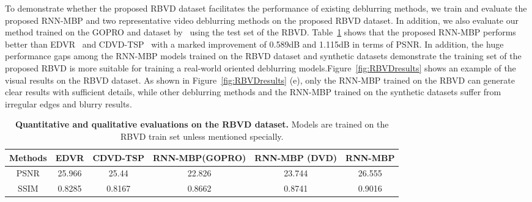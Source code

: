 \documentclass[letterpaper]{article} \usepackage{aaai22}  \usepackage{times}  \usepackage{helvet}  \usepackage{courier}  \usepackage[hyphens]{url}  \usepackage{graphicx} \urlstyle{rm} \def\UrlFont{\rm}  \usepackage{natbib}  \usepackage{caption} \DeclareCaptionStyle{ruled}{labelfont=normalfont,labelsep=colon,strut=off} \frenchspacing  \setlength{\pdfpagewidth}{8.5in}  \setlength{\pdfpageheight}{11in}  \newcommand{\hang}{\textcolor[rgb]{0.98,0.5,0.04}}
\begin{document}
To demonstrate whether the proposed RBVD dataset facilitates the performance of existing deblurring methods, we train and evaluate the proposed RNN-MBP and two representative video deblurring methods \cite{2019EDVR, Pan_2020_CVPR} on the proposed RBVD dataset. 
In addition, we also evaluate our method trained on the GOPRO and dataset by~\cite{Su_2017_CVPR} using the test set of the RBVD.
Table~\ref{RBVDTable} shows that the proposed RNN-MBP performs better than EDVR~\cite{2019EDVR} and CDVD-TSP~\cite{Pan_2020_CVPR} with a marked improvement of 0.589dB and 1.115dB in terms of PSNR.
In addition, the huge performance gaps among the RNN-MBP models trained on the RBVD dataset and synthetic datasets demonstrate the training set of the proposed RBVD is more suitable for training a real-world oriented deblurring models.Figure~\ref{fig:RBVDresults} shows an example of the visual results on the RBVD dataset.
As shown in Figure~\ref{fig:RBVDresults} (e), only the RNN-MBP trained on the RBVD can generate clear results with sufficient details, while other deblurring methods and the RNN-MBP trained on the synthetic datasets suffer from irregular edges and blurry results.
\begin{table}[!t] 
\centering
\begin{adjustbox}{width=\linewidth}
\begin{tabular}{c c c c c c}
    \hline
    {\bf Methods}   & EDVR     & CDVD-TSP    & RNN-MBP(GOPRO)    & RNN-MBP (DVD)   & RNN-MBP   \\
    \hline
    PSNR            & 25.966   & 25.44       & 22.826            & 23.744         & 26.555   \\
    SSIM            & 0.8285   & 0.8167      & 0.8662            & 0.8741         & 0.9016    \\ 
    \hline
\end{tabular}
\end{adjustbox}
\vspace{-2mm}
\caption{{\bf Quantitative and qualitative evaluations on the RBVD dataset.} Models are trained on the RBVD train set unless mentioned specially.}
\label{RBVDTable}
\vspace{-5mm}
\end{table}



\vspace{-4mm}
\end{document}
